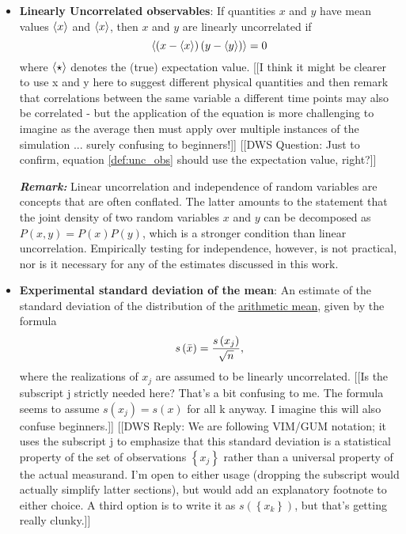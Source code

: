 \begin{itemize}
  \item {\bf Linearly Uncorrelated observables}:  If quantities $x$ and $y$ have mean values $\langle x \rangle$ and $\langle x \rangle$, then $x$ and $y$ are linearly uncorrelated if
\begin{equation}
  \langle  \left(x - \langle x \rangle \right) \left(y - \langle y \rangle \right)  \rangle = 0 \label{def:unc_obs}
\end{equation}
where $\langle \star \rangle$ denotes the (true) expectation value.
{\color{red}[[I think it might be clearer to use x and y here to suggest different physical quantities and then remark that correlations between the same variable a different time points may also be correlated - but the application of the equation is more challenging to imagine as the average then must apply over multiple instances of the simulation ... surely confusing to beginners!]]}
{\color{blue}[[DWS Question: Just to confirm, equation \ref{def:unc_obs} should use the expectation value, right?]]}

\smallskip

\textbf{\textit{Remark:}} Linear uncorrelation and independence of random variables are concepts that are often conflated.  The latter amounts to the statement that the joint density of two random variables $x$ and $y$ can be decomposed as $P(x,y)=P(x)P(y)$, which is a stronger condition than linear uncorrelation.  Empirically testing for independence, however, is not practical, nor is it necessary for any of the estimates discussed in this work.
  
\item {\bf Experimental standard deviation of the mean}: An estimate of the standard deviation of the distribution of the \hyperref[def:arith_mean]{arithmetic mean}, given by the formula
  \begin{equation}
    s\left( \bar{x} \right) = \dfrac{s\left( x_j \right)}{\sqrt{n}}, \label{def:exp_st_dev_mean}
  \end{equation}
  where the realizations of $x_j$ are assumed to be linearly uncorrelated.
  {\color{red}[[Is the subscript j strictly needed here?  That's a bit confusing to me.  The formula seems to assume $s(x_j) = s(x)$ for all k anyway.  I imagine this will also confuse beginners.]]}
  {\color{blue}[[DWS Reply: We are following VIM/GUM notation; it uses the subscript j to emphasize that this standard deviation is a statistical property of the set of observations $\left\{x_j\right\}$ rather than a universal property of the actual measurand. I'm open to either usage (dropping the subscript would actually simplify latter sections), but would add an explanatory footnote to either choice. A third option is to write it as $s\left(\left\{x_k\right\}\right)$, but that's getting really clunky.]]}
  

\end{itemize}
